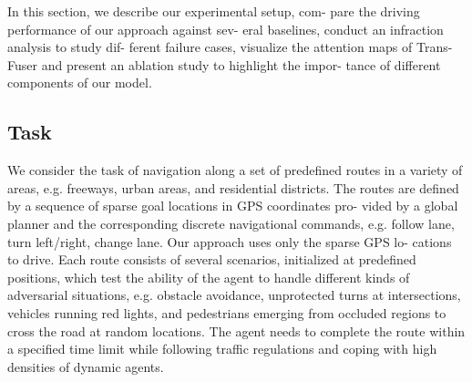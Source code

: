 \documentclass[letterpaper, 12pt]{article}
\theoremstyle{definition}
\theoremstyle{definition}
\theoremstyle{definition}
\theoremstyle{definition}
\theoremstyle{definition}
\begin{document}
In this section, we describe our experimental setup, com-
pare the driving performance of our approach against sev-
eral baselines, conduct an infraction analysis to study dif-
ferent failure cases, visualize the attention maps of Trans-
Fuser and present an ablation study to highlight the impor-
tance of different components of our model.

\subsection{Task}
\label{sec:org9ded237}
We consider the task of navigation along a set of
predefined routes in a variety of areas, e.g. freeways, urban
areas, and residential districts. The routes are defined by a
sequence of sparse goal locations in GPS coordinates pro-
vided by a global planner and the corresponding discrete
navigational commands, e.g. follow lane, turn left/right,
change lane. Our approach uses only the sparse GPS lo-
cations to drive. Each route consists of several scenarios,
initialized at predefined positions, which test the ability of
the agent to handle different kinds of adversarial situations,
e.g. obstacle avoidance, unprotected turns at intersections,
vehicles running red lights, and pedestrians emerging from
occluded regions to cross the road at random locations. The
agent needs to complete the route within a specified time
limit while following traffic regulations and coping with
high densities of dynamic agents.
\end{document}
